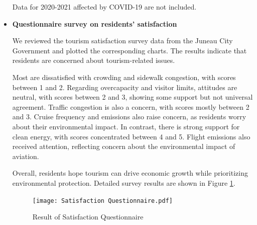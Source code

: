 \documentclass{mcmthesis}
\begin{document}
\begin{itemize}
\begin{table}[htbp]
  \vspace{0.5em}
  {\small\color{NoteColor}\raggedright 
    Data for 2020-2021 affected by COVID-19 are not included.
  }
\end{table}
  \item \textbf{Questionnaire survey on residents' satisfaction}\par
  We reviewed the tourism satisfaction survey data from the Juneau City Government 
  and plotted the corresponding charts. The results indicate that residents are 
  concerned about tourism-related issues.\par Most are dissatisfied with crowding and 
  sidewalk congestion, with scores between 1 and 2. Regarding overcapacity and 
  visitor limits, attitudes are neutral, with scores between 2 and 3, showing some 
  support but not universal agreement. Traffic congestion is also a concern, with 
  scores mostly between 2 and 3. Cruise frequency and emissions also raise concern, 
  as residents worry about their environmental impact. In contrast, there is strong 
  support for clean energy, with scores concentrated between 4 and 5. Flight emissions 
  also received attention, reflecting concern about the environmental impact of 
  aviation.\par Overall, residents hope tourism can drive economic growth while prioritizing 
  environmental protection. Detailed survey results are shown in Figure \ref{fig:satisfy}.
  \begin{figure}[h!] 
    \centering
    {\texttt{[image: Satisfaction Questionnaire.pdf]}} %
    \caption{Result of Satisfaction Questionnaire} \label{fig:satisfy}
  \end{figure}
\end{itemize}
\end{document}
